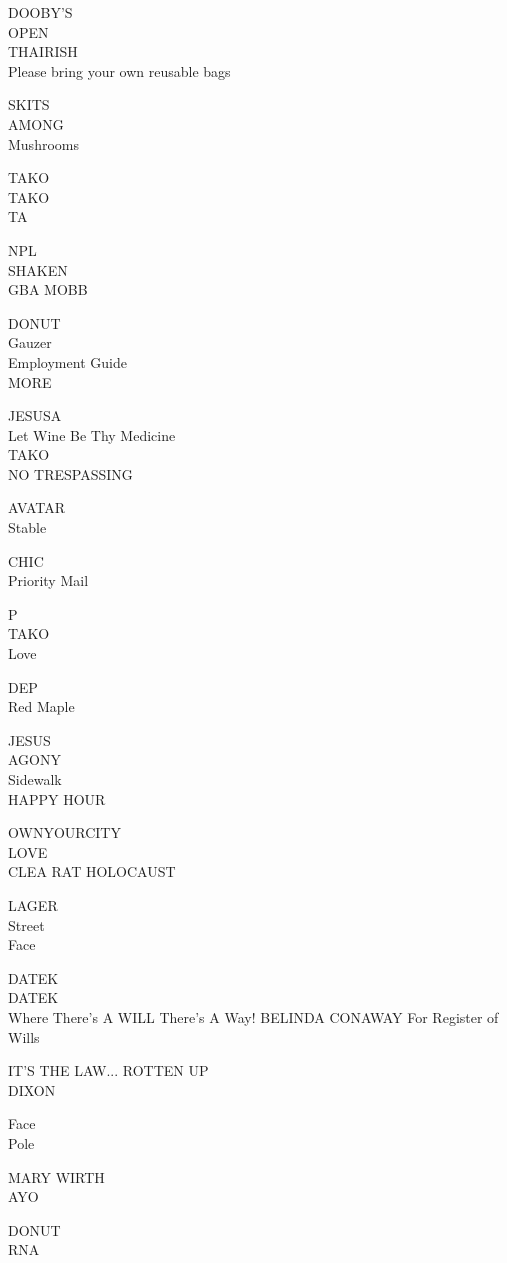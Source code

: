 \documentclass[10pt,letterpaper]{article}
\begin{document}
DOOBY'S\\
OPEN\\
THAIRISH\\
Please bring your own reusable bags

SKITS\\
AMONG\\
Mushrooms

TAKO\\
TAKO\\
TA

NPL\\
SHAKEN\\
GBA MOBB

DONUT\\
Gauzer\\
Employment Guide\\
MORE

JESUSA\\
Let Wine Be Thy Medicine\\
TAKO\\
NO TRESPASSING

AVATAR\\
Stable

CHIC\\
Priority Mail

P\\
TAKO\\
Love

DEP\\
Red Maple

JESUS\\
AGONY\\
Sidewalk\\
HAPPY HOUR

OWNYOURCITY\\
LOVE\\
CLEA RAT HOLOCAUST

LAGER\\
Street\\
Face

DATEK\\
DATEK\\
Where There's A WILL There's A Way!  BELINDA CONAWAY For Register of Wills

IT'S THE LAW... ROTTEN UP\\
DIXON

Face\\
Pole

MARY WIRTH\\
AYO

DONUT\\
RNA
\pagebreak
\end{document}
